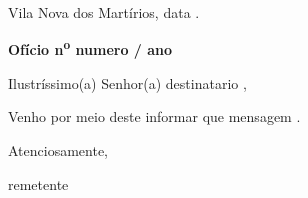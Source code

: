 \documentclass[12pt]{article}
\begin{document}
\vspace{3.5cm}

\begin{flushright}
Vila Nova dos Martírios, {{ data }}.
\end{flushright}

\vspace{1.5cm}

\textbf{Ofício n\textsuperscript{o} {{ numero }}/{{ ano }}}

\vspace{1.5em}

Ilustríssimo(a) Senhor(a) {{ destinatario }},

\vspace{1em}

Venho por meio deste informar que {{ mensagem }}.

\vspace{2.5em}

Atenciosamente,

\vspace{3em}

{{ remetente }}
\end{document}
